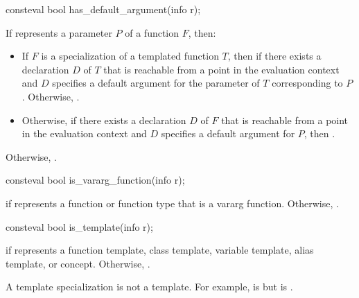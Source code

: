 %
\begin{itemdecl}
consteval bool has_default_argument(info r);
\end{itemdecl}

\begin{itemdescr}
\pnum
\returns
If  represents a parameter $P$ of a function $F$, then:
\begin{itemize}
\item
  If $F$ is a specialization of a templated function $T$,
  then  if there exists a declaration $D$ of $T$
  that is reachable from a point in the evaluation context
  and $D$ specifies a default argument
  for the parameter of $T$ corresponding to $P$.
  Otherwise, .
\item
  Otherwise, if there exists a declaration $D$ of $F$
  that is reachable from a point in the evaluation context
  and $D$ specifies a default argument for $P$,
  then .
\end{itemize}
Otherwise, .
\end{itemdescr}

%
\begin{itemdecl}
consteval bool is_vararg_function(info r);
\end{itemdecl}

\begin{itemdescr}
\pnum
\returns
{} if  represents a function or function type
that is a vararg function.
Otherwise, .
\end{itemdescr}

%
\begin{itemdecl}
consteval bool is_template(info r);
\end{itemdecl}

\begin{itemdescr}
\pnum
\returns
{} if  represents a
function template,
class template,
variable template,
alias template, or
concept.
Otherwise, .

\pnum
\begin{note}
A template specialization is not a template.
For example,
 is 
but  is .
\end{note}
\end{itemdescr}

